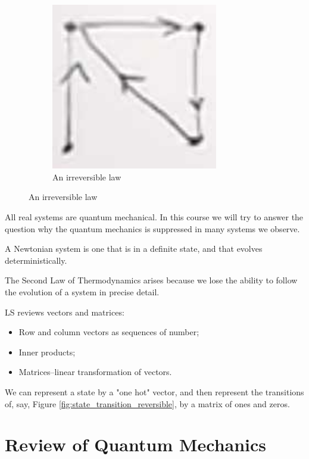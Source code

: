 \documentclass[]{article}
\begin{document}
\begin{figure}[H]
\begin{subfigure}[t]{0.45\textwidth}
	\end{subfigure}
	\begin{subfigure}[t]{0.45\textwidth}
		\caption{An irreversible law}
		\includegraphics[width=0.8\textwidth]{et-1-2}
	\end{subfigure}
\end{figure}

All real systems are quantum mechanical. In this course we will try to answer the question why the quantum mechanics is suppressed in many systems we observe.

A Newtonian system is one that is in a definite state, and that evolves deterministically.

The Second Law of Thermodynamics arises because we lose the ability to follow the evolution of a system in precise detail.

LS reviews vectors and matrices:
\begin{itemize}
	\item Row and column vectors as sequences of number;
	\item Inner products;
	\item Matrices--linear transformation of vectors.
\end{itemize}

We can represent a state by a "one hot" vector, and then represent the transitions of, say, Figure \ref{fig:state_transition_reversible}, by a matrix of ones and zeros.

\section{Review of Quantum Mechanics}
\end{document}
